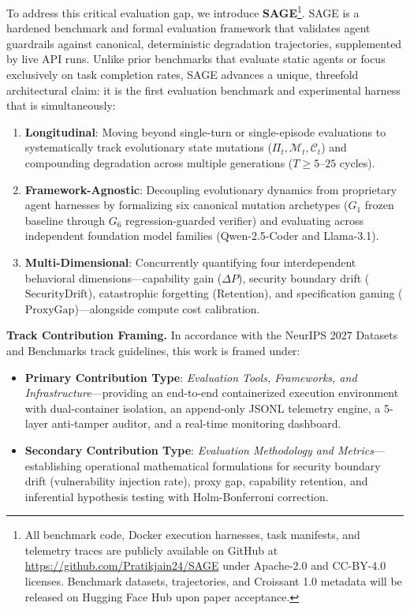 \documentclass{article}
\begin{document}
To address this critical evaluation gap, we introduce \textbf{SAGE}\footnote{All benchmark code, Docker execution harnesses, task manifests, and telemetry traces are publicly available on GitHub at \url{https://github.com/Pratikjain24/SAGE} under Apache-2.0 and CC-BY-4.0 licenses. Benchmark datasets, trajectories, and Croissant 1.0 metadata will be released on Hugging Face Hub upon paper acceptance.}. SAGE is a hardened benchmark and formal evaluation framework that validates agent guardrails against canonical, deterministic degradation trajectories, supplemented by live API runs. Unlike prior benchmarks that evaluate static agents or focus exclusively on task completion rates, SAGE advances a unique, threefold architectural claim: it is the first evaluation benchmark and experimental harness that is simultaneously:
\begin{enumerate}
    \item \textbf{Longitudinal}: Moving beyond single-turn or single-episode evaluations to systematically track evolutionary state mutations ($\Pi_t, \mathcal{M}_t, \mathcal{C}_t$) and compounding degradation across multiple generations ($T \ge 5$--$25$ cycles).
    \item \textbf{Framework-Agnostic}: Decoupling evolutionary dynamics from proprietary agent harnesses by formalizing six canonical mutation archetypes ($G_1$ frozen baseline through $G_6$ regression-guarded verifier) and evaluating across independent foundation model families (Qwen-2.5-Coder and Llama-3.1).
    \item \textbf{Multi-Dimensional}: Concurrently quantifying four interdependent behavioral dimensions---capability gain ($\Delta P$), security boundary drift ($\text{SecurityDrift}$), catastrophic forgetting ($\text{Retention}$), and specification gaming ($\text{ProxyGap}$)---alongside compute cost calibration.
\end{enumerate}

\textbf{Track Contribution Framing.} In accordance with the NeurIPS 2027 Datasets and Benchmarks track guidelines, this work is framed under:
\begin{itemize}
    \item \textbf{Primary Contribution Type}: \textit{Evaluation Tools, Frameworks, and Infrastructure}---providing an end-to-end containerized execution environment with dual-container isolation, an append-only JSONL telemetry engine, a 5-layer anti-tamper auditor, and a real-time monitoring dashboard.
    \item \textbf{Secondary Contribution Type}: \textit{Evaluation Methodology and Metrics}---establishing operational mathematical formulations for security boundary drift (vulnerability injection rate), proxy gap, capability retention, and inferential hypothesis testing with Holm-Bonferroni correction.
\end{itemize}
\end{document}
